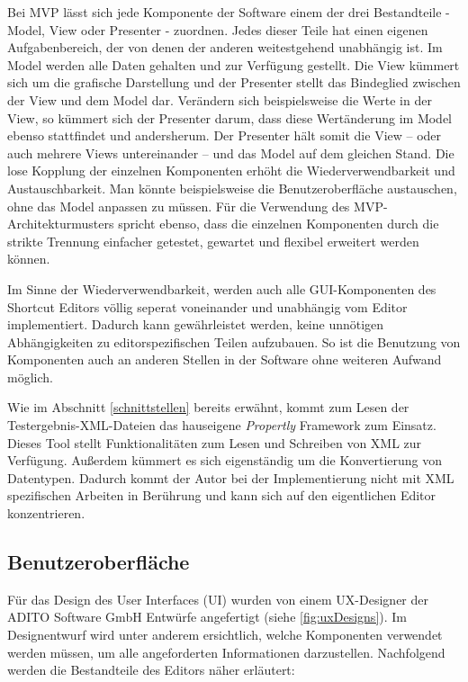 Bei MVP lässt sich jede Komponente der Software einem der drei Bestandteile - Model, View oder Presenter - zuordnen. Jedes dieser Teile hat einen eigenen Aufgabenbereich, der von denen der anderen weitestgehend unabhängig ist. Im Model werden alle Daten gehalten und zur Verfügung gestellt. Die View kümmert sich um die grafische Darstellung und der Presenter stellt das Bindeglied zwischen der View und dem Model dar. Verändern sich beispielsweise die Werte in der View, so kümmert sich der Presenter darum, dass diese Wertänderung im Model ebenso stattfindet und andersherum. Der Presenter hält somit die View -- oder auch mehrere Views untereinander -- und das Model auf dem gleichen Stand. Die lose Kopplung der einzelnen Komponenten erhöht die Wiederverwendbarkeit und Austauschbarkeit. Man könnte beispielsweise die Benutzeroberfläche austauschen, ohne das Model anpassen zu müssen. Für die Verwendung des MVP-Architekturmusters spricht ebenso, dass die einzelnen Komponenten durch die strikte Trennung einfacher getestet, gewartet und flexibel erweitert werden können.

\vfill

Im Sinne der Wiederverwendbarkeit, werden auch alle GUI-Komponenten des Shortcut Editors völlig seperat voneinander und unabhängig vom Editor implementiert. Dadurch kann gewährleistet werden, keine unnötigen Abhängigkeiten zu editorspezifischen Teilen aufzubauen. So ist die Benutzung von Komponenten auch an anderen Stellen in der Software ohne weiteren Aufwand möglich.

\vfill

Wie im Abschnitt \ref{schnittstellen} bereits erwähnt, kommt zum Lesen der Testergebnis-XML-Dateien das hauseigene \emph{Propertly} Framework zum Einsatz. Dieses Tool stellt Funktionalitäten zum Lesen und Schreiben von XML zur Verfügung. Außerdem kümmert es sich eigenständig um die Konvertierung von Datentypen. Dadurch kommt der Autor bei der Implementierung nicht mit XML spezifischen Arbeiten in Berührung und kann sich auf den eigentlichen Editor konzentrieren.

\newpage

\subsection{Benutzeroberfläche}
\label{ui}

Für das Design des User Interfaces (UI) wurden von einem UX-Designer der ADITO Software GmbH Entwürfe angefertigt (siehe \autoref{fig:uxDesigns}). Im Designentwurf wird unter anderem ersichtlich, welche Komponenten verwendet werden müssen, um alle angeforderten Informationen darzustellen. Nachfolgend werden die Bestandteile des Editors näher erläutert:

